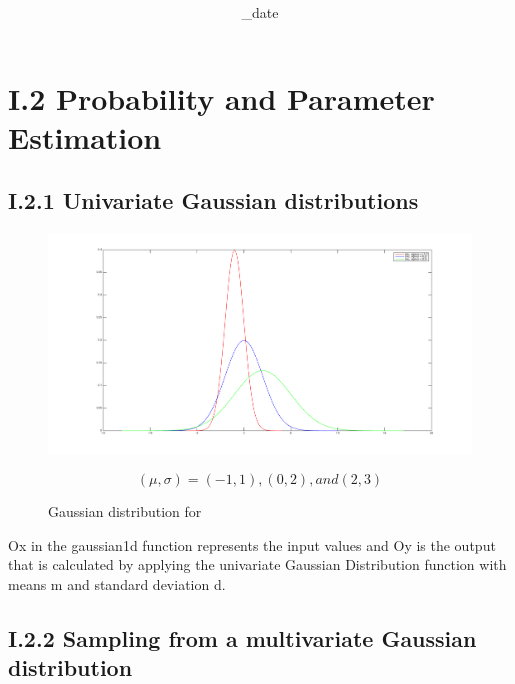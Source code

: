 \documentclass{article}      %
\title{\textbf{\Course}\\\textbf{\Exam}}
\author{\Studentname}
\date{\Sub_date}      %
\begin{document}

\maketitle                   %

\section*{I.2 Probability and Parameter Estimation}
\subsection*{I.2.1 Univariate Gaussian distributions}

\begin{figure}[ht]
\centering
\includegraphics[scale=.3]{img/i21}
\caption{Gaussian distribution for  \label{overflow}}
\[(\mu,\sigma) = (-1, 1), (0, 2), and (2, 3)   \]
\end{figure}

Ox in the gaussian1d function represents the input values and Oy is the output that is calculated by applying the univariate Gaussian Distribution function with means m and standard deviation d.\\

\subsection*{I.2.2 Sampling from a multivariate Gaussian distribution}
\end{document}
